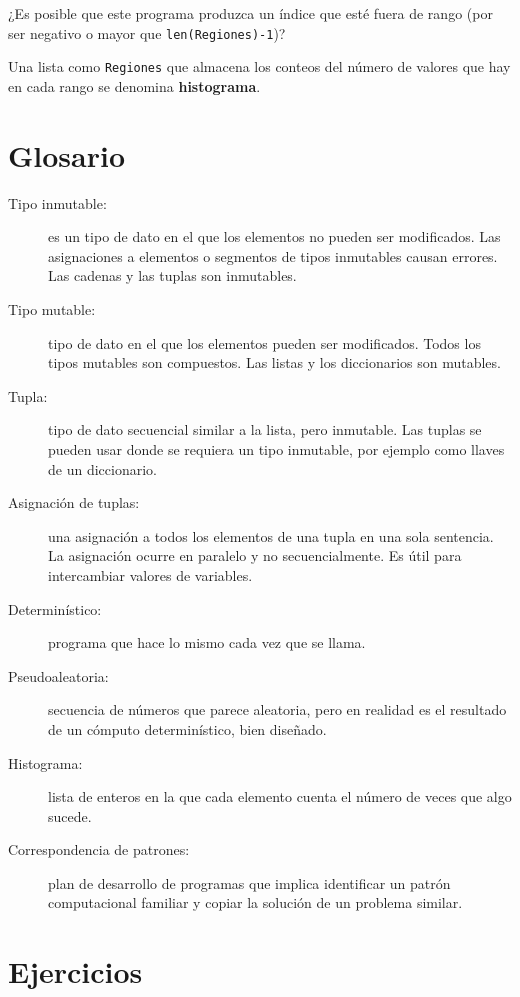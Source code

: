 ¿Es posible que este programa produzca un índice que esté fuera de
rango (por ser negativo o mayor que \texttt{len(Regiones)-1})?

Una lista como \texttt{Regiones} que almacena los conteos del número
de valores que hay en cada rango se denomina \textbf{histograma}.

\section{Glosario}
\begin{description}
\item [{Tipo inmutable:}] es un tipo de dato en el que los elementos no
pueden ser modificados. Las asignaciones a elementos o segmentos de
tipos inmutables causan errores. Las cadenas y las tuplas son inmutables.
\item [{Tipo mutable:}] tipo de dato en el que los elementos pueden ser
modificados. Todos los tipos mutables son compuestos. Las listas y
los diccionarios son mutables.
\item [{Tupla:}] tipo de dato secuencial similar a la lista, pero inmutable.
Las tuplas se pueden usar donde se requiera un tipo inmutable, por
ejemplo como llaves de un diccionario.
\item [{Asignación de tuplas:}] una asignación a todos los elementos
de una tupla en una sola sentencia. La asignación ocurre en paralelo
y no secuencialmente. Es útil para intercambiar valores de variables.
\item [{Determinístico:}] programa que hace lo mismo cada vez que se llama.
\item [{Pseudoaleatoria:}] secuencia de números que parece aleatoria, pero
en realidad es el resultado de un cómputo determinístico, bien diseñado.
\item [{Histograma:}] lista de enteros en la que cada elemento cuenta el
número de veces que algo sucede.
\item [{Correspondencia de patrones:}] plan de desarrollo de programas
que implica identificar un patrón computacional familiar y copiar
la solución de un problema similar.

   
  
 
\end{description}

\section{Ejercicios}

